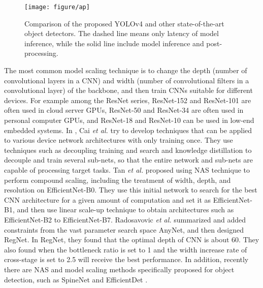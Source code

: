 \documentclass[10pt,twocolumn,letterpaper]{article}
\begin{document}
\begin{figure}[t]
	\begin{center}
		\texttt{[image: figure/ap]}
	\end{center}
	\caption{Comparison of the proposed YOLOv4 and other state-of-the-art object detectors. The dashed line means only latency of model inference, while the solid line include model inference and post-processing.}
	\label{fig:ap}
\end{figure}

The most common model scaling technique is to change the depth (number of convolutional layers in a CNN) and width (number of convolutional filters in a convolutional layer) of the backbone, and then train CNNs suitable for different devices.  For example among the ResNet \cite{he2016deep} series, ResNet-152 and ResNet-101 are often used in cloud server GPUs, ResNet-50 and ResNet-34 are often used in personal computer GPUs, and ResNet-18 and ResNet-10 can be used in low-end embedded systems.  In \cite{cai2019once}, Cai \textit{et al.} try to develop techniques that can be applied to various device network architectures with only training once.  They use techniques such as decoupling training and search and knowledge distillation to decouple and train several sub-nets, so that the entire network and sub-nets are capable of processing target tasks.  Tan \textit{et al.} \cite{tan2019efficientnet} proposed using NAS technique to perform compound scaling, including the treatment of width, depth, and resolution on EfficientNet-B0. They use this initial network to search for the best CNN architecture for a given amount of computation and set it as EfficientNet-B1, and then use linear scale-up technique to obtain architectures such as EfficientNet-B2 to EfficientNet-B7.  Radosavovic \textit{et al.} \cite{radosavovic2020designing} summarized and added constraints from the vast parameter search space AnyNet, and then designed RegNet.  In RegNet, they found that the optimal depth of CNN is about 60.  They also found when the bottleneck ratio is set to 1 and the width increase rate of cross-stage is set to 2.5 will receive the best performance.  In addition, recently there are NAS and model scaling methods specifically proposed for object detection, such as SpineNet \cite{du2019spinenet} and EfficientDet \cite{tan2019efficientdet}.
\end{document}
